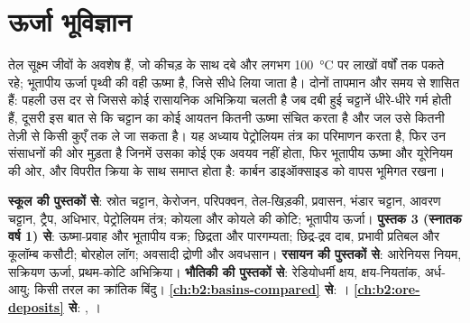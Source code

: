 \chapter{ऊर्जा भूविज्ञान}\label{ch:b2:energy-geology}

तेल सूक्ष्म जीवों के अवशेष हैं, जो कीचड़ के साथ दबे और लगभग \qty{100}{\celsius} पर लाखों वर्षों तक
पकते रहे; भूतापीय ऊर्जा पृथ्वी की वही ऊष्मा है, जिसे सीधे लिया जाता है। दोनों तापमान और समय से शासित हैं:
पहली उस दर से जिससे कोई रासायनिक अभिक्रिया चलती है जब दबी हुई चट्टानें धीरे-धीरे गर्म होती हैं, दूसरी इस
बात से कि चट्टान का कोई आयतन कितनी ऊष्मा संचित करता है और जल उसे कितनी तेज़ी से किसी कुएँ तक ले जा सकता है।
यह अध्याय पेट्रोलियम तंत्र का परिमाणन करता है, फिर उन संसाधनों की ओर मुड़ता है जिनमें उसका कोई एक अवयव
नहीं होता, फिर भूतापीय ऊष्मा और यूरेनियम की ओर, और विपरीत क्रिया के साथ समाप्त होता है:
कार्बन डाइऑक्साइड को वापस भूमिगत रखना।

\begin{recall}
\textbf{स्कूल की पुस्तकों से}: स्रोत चट्टान, केरोजन, परिपक्वन, तेल-खिड़की, प्रवासन,
भंडार चट्टान, आवरण चट्टान, ट्रैप, अधिभार, पेट्रोलियम तंत्र; कोयला और कोयले की कोटि; भूतापीय ऊर्जा।
\textbf{पुस्तक 3 (स्नातक वर्ष 1) से}: ऊष्मा-प्रवाह और भूतापीय वक्र; छिद्रता और पारगम्यता; छिद्र-द्रव
दाब, प्रभावी प्रतिबल और कूलॉम्ब कसौटी; बोरहोल लॉग; अवसादी द्रोणी और
अवधसान। \textbf{रसायन की पुस्तकों से}: आरेनियस नियम, सक्रियण ऊर्जा, प्रथम-कोटि
अभिक्रिया। \textbf{भौतिकी की पुस्तकों से}: रेडियोधर्मी क्षय, क्षय-नियतांक, अर्ध-आयु; किसी तरल का
क्रांतिक बिंदु। \textbf{\cref{ch:b2:basins-compared} से}: ।
\textbf{\cref{ch:b2:ore-deposits} से}: , ।
\end{recall}

